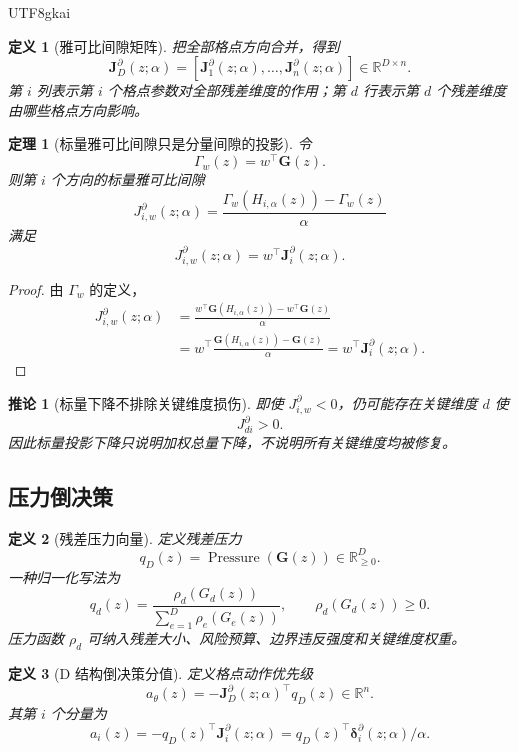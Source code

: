 \documentclass[12pt]{article}
\newtheorem{definition}{定义}[section]
\newtheorem{theorem}{定理}[section]
\newtheorem{corollary}{推论}[section]
\newcommand{\RR}{\mathbb{R}}
\DeclareMathOperator{\Pressure}{Pressure}
\begin{document}
\begin{CJK*}{UTF8}{gkai}
\begin{definition}[雅可比间隙矩阵]
把全部格点方向合并，得到
\[
  \boxed{
  \mathbf J_D^\partial(z;\alpha)
  =
  \left[
  \mathbf J_1^\partial(z;\alpha),
  \ldots,
  \mathbf J_n^\partial(z;\alpha)
  \right]
  \in\RR^{D\times n}
  } .
\]
第 \(i\) 列表示第 \(i\) 个格点参数对全部残差维度的作用；第 \(d\) 行表示第
\(d\) 个残差维度由哪些格点方向影响。
\end{definition}

\begin{theorem}[标量雅可比间隙只是分量间隙的投影]
\label{thm:lhts-scalar-projection}
令
\[
  \Gamma_w(z)=w^\top\mathbf G(z).
\]
则第 \(i\) 个方向的标量雅可比间隙
\[
  J_{i,w}^{\partial}(z;\alpha)
  =
  \frac{\Gamma_w(H_{i,\alpha}(z))-\Gamma_w(z)}{\alpha}
\]
满足
\[
  J_{i,w}^{\partial}(z;\alpha)
  =
  w^\top\mathbf J_i^\partial(z;\alpha).
\]
\end{theorem}

\begin{proof}
由 \(\Gamma_w\) 的定义，
\[
\begin{aligned}
  J_{i,w}^{\partial}(z;\alpha)
  &=
  \frac{
  w^\top\mathbf G(H_{i,\alpha}(z))
  -
  w^\top\mathbf G(z)
  }{\alpha}  \\
  &=
  w^\top
  \frac{
  \mathbf G(H_{i,\alpha}(z))-\mathbf G(z)
  }{\alpha}
  =
  w^\top\mathbf J_i^\partial(z;\alpha).
\end{aligned}
\]
\end{proof}

\begin{corollary}[标量下降不排除关键维度损伤]
即使 \(J_{i,w}^{\partial}<0\)，仍可能存在关键维度 \(d\) 使
\[
  J_{di}^{\partial}>0 .
\]
因此标量投影下降只说明加权总量下降，不说明所有关键维度均被修复。
\end{corollary}

\subsection{压力倒决策}
\label{subsec:lhts-pressure-pullback}

\begin{definition}[残差压力向量]
定义残差压力
\[
  q_D(z)=\Pressure(\mathbf G(z))\in\RR_{\ge0}^{D}.
\]
一种归一化写法为
\[
  q_d(z)
  =
  \frac{\rho_d(G_d(z))}
  {\sum_{e=1}^{D}\rho_e(G_e(z))},
  \qquad
  \rho_d(G_d(z))\ge0 .
\]
压力函数 \(\rho_d\) 可纳入残差大小、风险预算、边界违反强度和关键维度权重。
\end{definition}

\begin{definition}[D 结构倒决策分值]
\label{def:lhts-d-decision}
定义格点动作优先级
\[
  a_\theta(z)
  =
  -\mathbf J_D^\partial(z;\alpha)^\top q_D(z)
  \in\RR^n .
\]
其第 \(i\) 个分量为
\[
  a_i(z)
  =
  -q_D(z)^\top\mathbf J_i^\partial(z;\alpha)
  =
  q_D(z)^\top\boldsymbol\delta_i^\partial(z;\alpha)/\alpha .
\]
\end{definition}


\end{CJK*}
\end{document}
